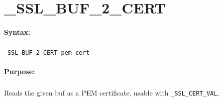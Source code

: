 
\newpage
\section{\_SSL\_BUF\_2\_CERT}
\label{cmd:_SSL_BUF_2_CERT}

\paragraph{Syntax:}
\subparagraph{}
\texttt{\_SSL\_BUF\_2\_CERT pem cert}

\paragraph{Purpose:}
\subparagraph{}
Reads the given buf as a PEM certificate, usable with 
\texttt{\_SSL\_CERT\_VAL}.


